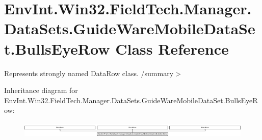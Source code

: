 \hypertarget{class_env_int_1_1_win32_1_1_field_tech_1_1_manager_1_1_data_sets_1_1_guide_ware_mobile_data_set_1_1_bulls_eye_row}{}\section{Env\+Int.\+Win32.\+Field\+Tech.\+Manager.\+Data\+Sets.\+Guide\+Ware\+Mobile\+Data\+Set.\+Bulls\+Eye\+Row Class Reference}
\label{class_env_int_1_1_win32_1_1_field_tech_1_1_manager_1_1_data_sets_1_1_guide_ware_mobile_data_set_1_1_bulls_eye_row}


Represents strongly named Data\+Row class. /summary$>$  


Inheritance diagram for Env\+Int.\+Win32.\+Field\+Tech.\+Manager.\+Data\+Sets.\+Guide\+Ware\+Mobile\+Data\+Set.\+Bulls\+Eye\+Row\+:\begin{figure}[H]
\begin{center}
\leavevmode
\includegraphics[height=0.763463cm]{class_env_int_1_1_win32_1_1_field_tech_1_1_manager_1_1_data_sets_1_1_guide_ware_mobile_data_set_1_1_bulls_eye_row}
\end{center}
\end{figure}
